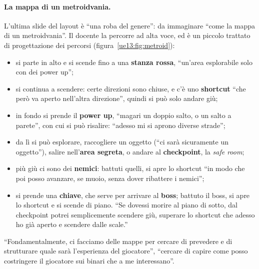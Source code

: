 \paragraph{La mappa di un metroidvania.} L'ultima slide del layout è ``una roba del
genere'': da immaginare ``come la mappa di un metroidvania''. Il docente la percorre ad alta
voce, ed è un piccolo trattato di progettazione dei percorsi (figura~\ref{ue13:fig:metroid}):
\begin{itemize}
  \item si parte in alto e si scende fino a una \textbf{stanza rossa}, ``un'area
        esplorabile solo con dei power up'';
  \item si continua a scendere: certe direzioni sono chiuse, e c'è uno
        \textbf{shortcut} ``che però va aperto nell'altra direzione'', quindi si può solo
        andare giù;
  \item in fondo si prende il \textbf{power up}, ``magari un doppio salto, o un salto a
        parete'', con cui si può risalire: ``adesso mi si aprono diverse strade'';
  \item da lì si può esplorare, raccogliere un oggetto (``ci sarà sicuramente un
        oggetto''), salire nell'\textbf{area segreta}, o andare al \textbf{checkpoint},
        la \emph{safe room};
  \item più giù ci sono dei \textbf{nemici}: battuti quelli, si apre lo shortcut ``in modo
        che poi posso avanzare, se muoio, senza dover ribattere i nemici'';
  \item si prende una \textbf{chiave}, che serve per arrivare al \textbf{boss}; battuto
        il boss, si apre lo shortcut e si scende di piano. ``Se dovessi morire al piano di
        sotto, dal checkpoint potrei semplicemente scendere giù, superare lo shortcut che
        adesso ho già aperto e scendere dalle scale.''
\end{itemize}
``Fondamentalmente, ci facciamo delle mappe per cercare di prevedere e di strutturare quale
sarà l'esperienza del giocatore'', ``cercare di capire come posso costringere il giocatore
sui binari che a me interessano''.

